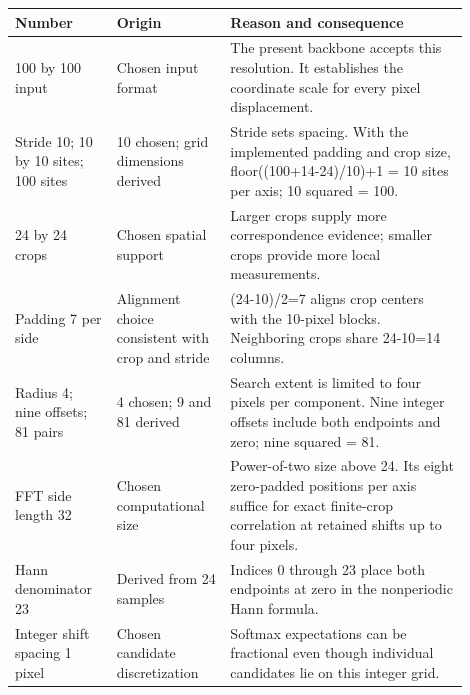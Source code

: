 \documentclass[11pt,letterpaper]{article}
\begin{document}
\begin{center}\small\renewcommand{\arraystretch}{1.16}\setlength{\tabcolsep}{4pt}\begin{tabular}{p{0.202\linewidth}p{0.220\linewidth}p{0.478\linewidth}}\toprule

\textbf{Number} & \textbf{Origin} & \textbf{Reason and consequence} \\

\midrule

100 by 100 input & Chosen input format & The present backbone accepts this resolution. It establishes the coordinate scale for every pixel displacement. \\

Stride 10; 10 by 10 sites; 100 sites & 10 chosen; grid dimensions derived & Stride sets spacing. With the implemented padding and crop size, floor((100+14-24)/\allowbreak{}10)+1 = 10 sites per axis; 10 squared = 100. \\

24 by 24 crops & Chosen spatial support & Larger crops supply more correspondence evidence; smaller crops provide more local measurements. \\

Padding 7 per side & Alignment choice consistent with crop and stride & (24-10)/\allowbreak{}2=7 aligns crop centers with the 10-pixel blocks. Neighboring crops share 24-10=14 columns. \\

Radius 4; nine offsets; 81 pairs & 4 chosen; 9 and 81 derived & Search extent is limited to four pixels per component. Nine integer offsets include both endpoints and zero; nine squared = 81. \\

FFT side length 32 & Chosen computational size & Power-of-two size above 24. Its eight zero-padded positions per axis suffice for exact finite-crop correlation at retained shifts up to four pixels. \\

Hann denominator 23 & Derived from 24 samples & Indices 0 through 23 place both endpoints at zero in the nonperiodic Hann formula. \\

Integer shift spacing 1 pixel & Chosen candidate discretization & Softmax expectations can be fractional even though individual candidates lie on this integer grid. \\

\bottomrule\end{tabular}\end{center}
\end{document}
